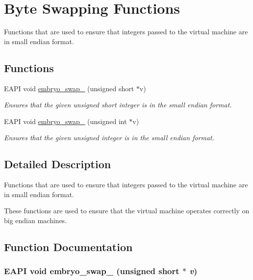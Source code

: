 \hypertarget{group__Embryo__Swap__Group}{
\section{Byte Swapping Functions}
\label{group__Embryo__Swap__Group}
}
Functions that are used to ensure that integers passed to the virtual machine are in small endian format.  
\subsection*{Functions}
\begin{CompactItemize}
\item 
EAPI void \hyperlink{group__Embryo__Swap__Group_g06748df04e7ec028a5bf81b6a2a820db}{embryo\_\-swap\_} (unsigned short $\ast$v)
\begin{CompactList}\small\item\em Ensures that the given unsigned short integer is in the small endian format. \item\end{CompactList}\item 
EAPI void \hyperlink{group__Embryo__Swap__Group_g9131c33a606c33dbe1dd8a2632567cdf}{embryo\_\-swap\_} (unsigned int $\ast$v)
\begin{CompactList}\small\item\em Ensures that the given unsigned integer is in the small endian format. \item\end{CompactList}\end{CompactItemize}


\subsection{Detailed Description}
Functions that are used to ensure that integers passed to the virtual machine are in small endian format. 

These functions are used to ensure that the virtual machine operates correctly on big endian machines. 

\subsection{Function Documentation}
\hypertarget{group__Embryo__Swap__Group_g06748df04e7ec028a5bf81b6a2a820db}{
\subsubsection{\setlength{\rightskip}{0pt plus 5cm}EAPI void embryo\_\-swap\_ (unsigned short $\ast$ {\em v})}}
\label{group__Embryo__Swap__Group_g06748df04e7ec028a5bf81b6a2a820db}


